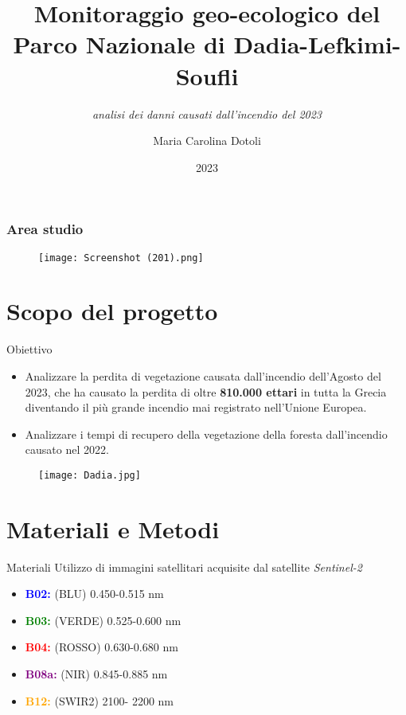 \documentclass{beamer}
\title{Monitoraggio geo-ecologico del Parco Nazionale di Dadia-Lefkimi-Soufli}
\subtitle{\textit{analisi dei danni causati dall'incendio del 2023}}
\author{Maria Carolina Dotoli}
\institute{Alma Mater Studiorum - Università di Bologna}
\date{2023}
\begin{document}
\maketitle



\begin{frame}
\frametitle{\textbf{Area studio}}
\begin{figure}
    \centering
    \texttt{[image: Screenshot (201).png]}
\end{figure}
 \end{frame}
 \section{Scopo del progetto}

\begin{frame}{Obiettivo}
\begin{itemize}[label=$\bullet$]
    \item  Analizzare la perdita di vegetazione causata dall'incendio dell'Agosto del 2023, che ha causato la perdita di oltre \textbf{810.000 ettari} in tutta la Grecia diventando il più grande incendio mai registrato nell'Unione Europea. 
    \item Analizzare i tempi di recupero della vegetazione della foresta dall'incendio causato nel 2022. 
\end{itemize}
    \begin{figure}
        \centering
        \texttt{[image: Dadia.jpg]}
    \end{figure}
\end{frame}

\section{Materiali e Metodi}

\begin{frame}{Materiali}
Utilizzo di immagini satellitari acquisite dal satellite \textit{Sentinel-2}
\begin{itemize}[topsep=22pt]
    \item \textbf{\textcolor{blue}{B02:}} (BLU) 0.450-0.515 nm
    \item \textbf{\textcolor{green}{B03:}} (VERDE) 0.525-0.600 nm
    \item \textbf{\textcolor{red}{B04:}} (ROSSO) 0.630-0.680 nm
    \item \textbf{\textcolor{purple}{B08a:}} (NIR) 0.845-0.885 nm
    \item \textbf{\textcolor{orange}{B12:}} (SWIR2) 2100- 2200 nm 
\end{itemize}
\end{frame}
\end{document}

